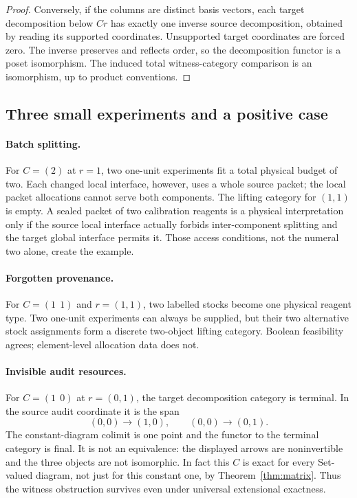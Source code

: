 \documentclass[11pt]{article}
\theoremstyle{definition}\newtheorem{definition}[theorem]{Definition}
\theoremstyle{remark}\newtheorem{remark}[theorem]{Remark}
\begin{document}
\begin{proof}
Conversely, if the columns are distinct basis vectors, each target
decomposition below $Cr$ has exactly one inverse source decomposition,
obtained by reading its supported coordinates. Unsupported target
coordinates are forced zero. The inverse preserves and reflects order,
so the decomposition functor is a poset isomorphism. The induced total
witness-category comparison is an isomorphism, up to product conventions.
\end{proof}

\subsection{Three small experiments and a positive case}
\paragraph{Batch splitting.}
For $C=(2)$ at $r=1$, two one-unit experiments fit a total physical budget
of two. Each changed local interface, however, uses a whole source packet;
the local packet allocations cannot serve both components. The lifting
category for $(1,1)$ is empty. A sealed packet of two calibration reagents
is a physical interpretation only if the source local interface actually
forbids inter-component splitting and the target global interface permits
it. Those access conditions, not the numeral two alone, create the example.

\paragraph{Forgotten provenance.}
For $C=(1\ \ 1)$ and $r=(1,1)$, two labelled stocks become one physical
reagent type. Two one-unit experiments can always be supplied, but their
two alternative stock assignments form a discrete two-object lifting
category. Boolean feasibility agrees; element-level allocation data does not.

\paragraph{Invisible audit resources.}
For $C=(1\ \ 0)$ at $r=(0,1)$, the target decomposition category is
terminal. In the source audit coordinate it is the span
\[
 (0,0)\longrightarrow(1,0),\qquad
 (0,0)\longrightarrow(0,1).
\]
The constant-diagram colimit is one point and the functor to the terminal
category is final. It is not an equivalence: the displayed arrows are
noninvertible and the three objects are not isomorphic. In fact this
$C$ is exact for every Set-valued diagram, not just for this constant one,
by Theorem~\ref{thm:matrix}. Thus the witness obstruction survives even
under universal extensional exactness.
\end{document}
